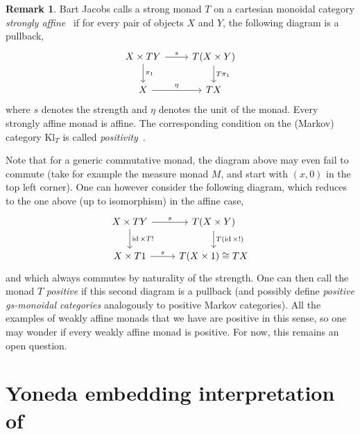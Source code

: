 \documentclass[a4paper,UKenglish,numberwithinsect,cleveref, autoref, thm-restate]{lipics-v2021}
\theoremstyle{plain} %
\theoremstyle{definition} %
\newtheorem{myremark}[mytheorem]{Remark}
\begin{document}
\begin{myremark}
 Bart Jacobs calls a strong monad $T$ on a cartesian monoidal category \emph{strongly affine}~\cite{Jacobs16} if for every pair of objects $X$ and $Y$, the following diagram is a pullback,
 \[
  \begin{tikzcd}
   X \times TY \ar{d}{\pi_1} \ar{r}{s} & T(X\times Y) \ar{d}{T\pi_1} \\
   X \ar{r}{\eta} & TX
  \end{tikzcd}
 \]
where $s$ denotes the strength and $\eta$ denotes the unit of the monad. Every strongly affine monad is affine. 
The corresponding condition on the (Markov) category $\mathrm{Kl}_T$ is called \emph{positivity}~\cite[Section~2]{fritz2022dilations}.

Note that for a generic commutative monad, the diagram above may even fail to commute (take for example the measure monad $M$, and start with $(x,0)$ in the top left corner). One can however consider the following diagram, which reduces to the one above (up to isomorphism) in the affine case,
\[
 \begin{tikzcd}
   X \times TY \ar{d}{\id\times T!} \ar{r}{s} & T(X\times Y) \ar{d}{T(\id\times!)} \\
   X \times T1 \ar{r}{s} & T(X\times 1) \cong TX
  \end{tikzcd}
\]
and which always commutes by naturality of the strength.
One can then call the monad $T$ \emph{positive} if this second diagram is a pullback (and possibly define \emph{positive gs-monoidal categories} analogously to positive Markov categories). 
All the examples of weakly affine monads that we have are positive in this sense, so one may wonder if every weakly affine monad is positive. For now, this remains an open question.

\end{myremark}




\appendix

\section{Yoneda embedding interpretation of }\label{yoneda}
\end{document}
